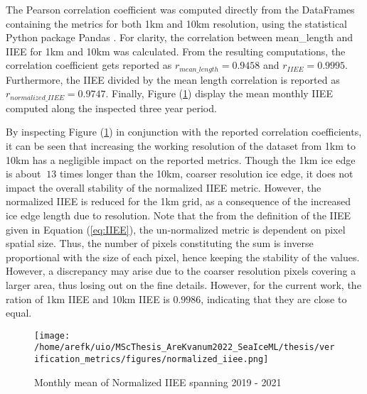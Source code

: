 \documentclass[../main/thesis.tex]{subfiles}
\begin{document}
The Pearson correlation coefficient was computed directly from the DataFrames containing the metrics for both 1km and 10km resolution, using the statistical Python package Pandas \cite{reback2020pandas,mckinney-proc-scipy-2010}. For clarity, the correlation between mean\_length and IIEE for 1km and 10km was calculated. From the resulting computations, the correlation coefficient gets reported as $r_{mean\_length} = 0.9458$ and $r_{IIEE} = 0.9995$. Furthermore, the IIEE divided by the mean length correlation is reported as $r_{normalized\_IIEE} = 0.9747$. Finally, Figure (\ref{fig:normIIEE}) display the mean monthly IIEE computed along the inspected three year period.

By inspecting Figure (\ref{fig:normIIEE}) in conjunction with the reported correlation coefficients, it can be seen that increasing the working resolution of the dataset from 1km to 10km has a negligible impact on the reported metrics. Though the 1km ice edge is about $~13$ times longer than the 10km, coarser resolution ice edge, it does not impact the overall stability of the normalized IIEE metric. However, the normalized IIEE is reduced for the 1km grid, as a consequence of the increased ice edge length due to resolution. Note that the from the definition of the IIEE given in Equation (\ref{eq:IIEE}), the un-normalized metric is dependent on pixel spatial size. Thus, the number of pixels constituting the sum is inverse proportional with the size of each pixel, hence keeping the stability of the values. However, a discrepancy may arise due to the coarser resolution pixels covering a larger area, thus losing out on the fine details. However, for the current work, the ration of 1km IIEE and 10km IIEE is $0.9986$, indicating that they are close to equal. 

\begin{figure}
    \texttt{[image: /home/arefk/uio/MScThesis\_AreKvanum2022\_SeaIceML/thesis/verification\_metrics/figures/normalized\_iiee.png]}

    \caption{\label{fig:normIIEE}Monthly mean of Normalized IIEE spanning 2019 - 2021}
\end{figure}


\biblio
\end{document}
